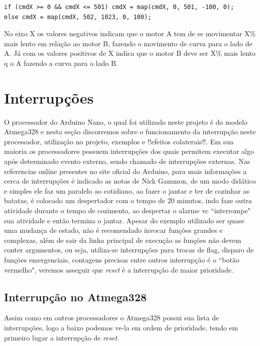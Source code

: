 \documentclass[a4paper,12pt,portuguese]{ufms-cpcx}
\begin{document}
\begin{lstlisting}
if (cmdX >= 0 && cmdX <= 501) cmdX = map(cmdX, 0, 501, -100, 0);
else cmdX = map(cmdX, 502, 1023, 0, 100);
\end{lstlisting}
No eixo X os valores negativos indicam que o motor A tem de se movimentar X\% mais lento em relação ao motor B, fazendo o movimento de curva para o lado de A. Já com os valores positivos de X indica que o motor B deve ser X\% mais lento q o A fazendo a curva para o lado B.

\chapter{Interrupções}
O processador do Arduino Nano, o qual foi utilizado neste projeto é do modelo Atmega328 e nesta seção discorremos sobre o funcionamento da interrupção neste processador, utilização no projeto, exemplos e !!efeitos colaterais!!.
Em sua maioria os processadores possuem interrupções dos quais permitem executar algo após determinado evento externo, sendo chamado de interrupções externas. Nas referencias online presentes no site oficial do Arduino, para mais informações a cerca de interrupções é indicado as notas de Nick Gammon, de um modo didático e simples ele faz um paralelo ao cotidiano, ao fazer o jantar e ter de cozinhar as batatas, é colocado um despertador com o tempo de 20 minutos, indo faze outra atividade durante o tempo de cozimento, ao despertar o alarme vc ``interrompe" sua atividade e então termina o jantar. Apesar do exemplo utilizado ser quase uma mudança de estado, não é recomendado invocar funções grandes e complexas, além de sair da linha principal de execução as funções não devem conter argumentos, ou seja, utiliza-se interrupções para trocas de flag, disparo de funções emergenciais, contagens precisas entre outros interrupção é o ``botão vermelho", veremos asseguir que \textit{reset} é a interrupção de maior prioridade.

\section{Interrupção no Atmega328}
Assim como em outros processadores o Atmega328 possui sua lista de interrupções, logo a baixo podemos ve-la em ordem de prioridade, tendo em primeiro lugar a interrupção de \textit{reset}.
\end{document}
